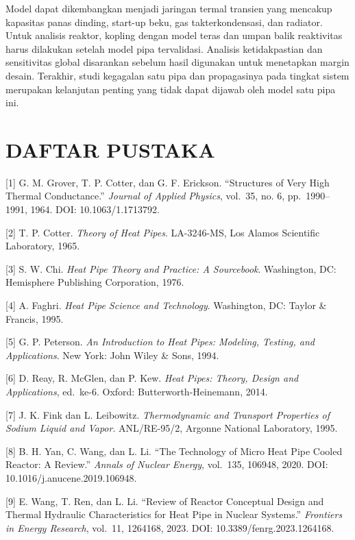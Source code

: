 \documentclass[
  12pt,
  12pt,a4paper,oneside]{report}
\begin{document}
Model dapat dikembangkan menjadi jaringan termal transien yang mencakup
kapasitas panas dinding, start-up beku, gas takterkondensasi, dan
radiator. Untuk analisis reaktor, kopling dengan model teras dan umpan
balik reaktivitas harus dilakukan setelah model pipa tervalidasi.
Analisis ketidakpastian dan sensitivitas global disarankan sebelum hasil
digunakan untuk menetapkan margin desain. Terakhir, studi kegagalan satu
pipa dan propagasinya pada tingkat sistem merupakan kelanjutan penting
yang tidak dapat dijawab oleh model satu pipa ini.

\hypertarget{daftar-pustaka}{%
\chapter*{DAFTAR PUSTAKA}\label{daftar-pustaka}}

{[}1{]} G. M. Grover, T. P. Cotter, dan G. F. Erickson. ``Structures of
Very High Thermal Conductance.'' \emph{Journal of Applied Physics},
vol.~35, no. 6, pp.~1990--1991, 1964. DOI: 10.1063/1.1713792.

{[}2{]} T. P. Cotter. \emph{Theory of Heat Pipes}. LA-3246-MS, Los
Alamos Scientific Laboratory, 1965.

{[}3{]} S. W. Chi. \emph{Heat Pipe Theory and Practice: A Sourcebook}.
Washington, DC: Hemisphere Publishing Corporation, 1976.

{[}4{]} A. Faghri. \emph{Heat Pipe Science and Technology}. Washington,
DC: Taylor \& Francis, 1995.

{[}5{]} G. P. Peterson. \emph{An Introduction to Heat Pipes: Modeling,
Testing, and Applications}. New York: John Wiley \& Sons, 1994.

{[}6{]} D. Reay, R. McGlen, dan P. Kew. \emph{Heat Pipes: Theory, Design
and Applications}, ed.~ke-6. Oxford: Butterworth-Heinemann, 2014.

{[}7{]} J. K. Fink dan L. Leibowitz. \emph{Thermodynamic and Transport
Properties of Sodium Liquid and Vapor}. ANL/RE-95/2, Argonne National
Laboratory, 1995.

{[}8{]} B. H. Yan, C. Wang, dan L. Li. ``The Technology of Micro Heat
Pipe Cooled Reactor: A Review.'' \emph{Annals of Nuclear Energy},
vol.~135, 106948, 2020. DOI: 10.1016/j.anucene.2019.106948.

{[}9{]} E. Wang, T. Ren, dan L. Li. ``Review of Reactor Conceptual
Design and Thermal Hydraulic Characteristics for Heat Pipe in Nuclear
Systems.'' \emph{Frontiers in Energy Research}, vol.~11, 1264168, 2023.
DOI: 10.3389/fenrg.2023.1264168.
\end{document}
